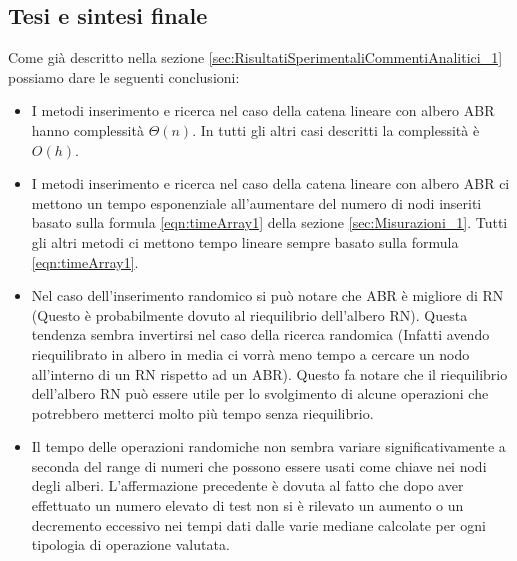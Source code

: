 \subsection{Tesi e sintesi finale}
\label{TesiSintesiFinale_1}
Come già descritto nella sezione \ref{sec:RisultatiSperimentaliCommentiAnalitici_1} possiamo dare le seguenti conclusioni:
\begin{itemize}
    \item I metodi inserimento e ricerca nel caso della catena lineare con albero ABR hanno complessità $\Theta(n)$. In tutti gli altri casi descritti la complessità è $O(h)$.
    \item I metodi inserimento e ricerca nel caso della catena lineare con albero ABR ci mettono un tempo esponenziale all'aumentare del numero di nodi inseriti basato sulla formula \ref{eqn:timeArray1} della sezione \ref{sec:Misurazioni_1}. Tutti gli altri metodi ci mettono tempo lineare sempre basato sulla formula \ref{eqn:timeArray1}.
    \item Nel caso dell'inserimento randomico si può notare che ABR è migliore di RN (Questo è probabilmente dovuto al riequilibrio dell'albero RN). Questa tendenza sembra invertirsi nel caso della ricerca randomica (Infatti avendo riequilibrato in albero in media ci vorrà meno tempo a cercare un nodo all'interno di un RN rispetto ad un ABR). Questo fa notare che il riequilibrio dell'albero RN può essere utile per lo svolgimento di alcune operazioni che potrebbero metterci molto più tempo senza riequilibrio.
    \item Il tempo delle operazioni randomiche non sembra variare significativamente a seconda del range di numeri che possono essere usati come chiave nei nodi degli alberi. L'affermazione precedente è dovuta al fatto che dopo aver effettuato un numero elevato di test non si è rilevato un aumento o un decremento eccessivo nei tempi dati dalle varie mediane calcolate per ogni tipologia di operazione valutata.
\end{itemize}



